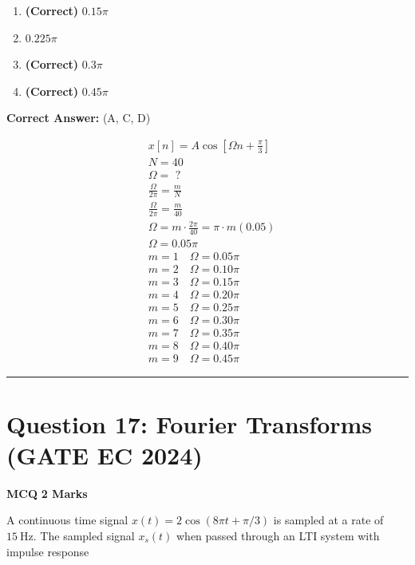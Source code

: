 \documentclass[11pt,a4paper]{article}
\begin{document}
\begin{enumerate}[label=(\Alph*)]
    \item \textbf{(Correct)} $0.15 \pi$
    \item $0.225 \pi$
    \item \textbf{(Correct)} $0.3 \pi$
    \item \textbf{(Correct)} $0.45 \pi$
\end{enumerate}

\noindent \textbf{Correct Answer:} (A, C, D)

\begin{tcolorbox}[solbox, title=Detailed Solution -- Question 16]
\[
\begin{aligned}
& x[n]=A \cos \left[\Omega n+\frac{\pi}{3}\right] \\
& N=40 \\
& \Omega=\text { ? } \\
& \frac{\Omega}{2 \pi}=\frac{m}{N} \\
& \frac{\Omega}{2 \pi}=\frac{m}{40} \\
& \Omega=m \cdot \frac{2 \pi}{40}=\pi \cdot m(0.05) \\
& \Omega=0.05 \pi \\
& m=1 \quad \Omega=0.05 \pi \\
& m=2 \quad \Omega=0.10 \pi \\
& m=3 \quad \Omega=0.15 \pi \\
& m=4 \quad \Omega=0.20 \pi \\
& m=5 \quad \Omega=0.25 \pi \\
& m=6 \quad \Omega=0.30 \pi \\
& m=7 \quad \Omega=0.35 \pi \\
& m=8 \quad \Omega=0.40 \pi \\
& m=9 \quad \Omega=0.45 \pi
\end{aligned}
\]
\end{tcolorbox}

\vspace{1.5em}
\hrule
\vspace{1.5em}

\section*{Question 17: Fourier Transforms (GATE EC 2024)}
\noindent \textbf{\color{primary}MCQ} \hfill \textbf{\color{secondary}2 Marks}


\noindent A continuous time signal $x(t)=2 \cos (8 \pi t+\pi / 3)$ is sampled at a rate of $15 \mathrm{~Hz}$. The sampled signal $x_{s}(t)$ when passed through an LTI system with impulse response
\end{document}
